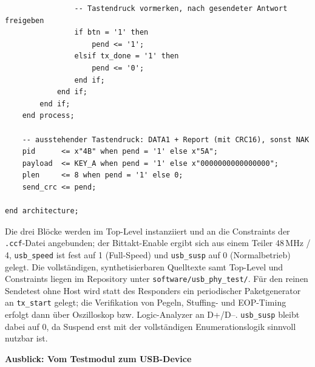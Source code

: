 \documentclass[a4paper,11pt]{article}
\begin{document}
\begin{verbatim}
                -- Tastendruck vormerken, nach gesendeter Antwort freigeben
                if btn = '1' then
                    pend <= '1';
                elsif tx_done = '1' then
                    pend <= '0';
                end if;
            end if;
        end if;
    end process;

    -- ausstehender Tastendruck: DATA1 + Report (mit CRC16), sonst NAK
    pid      <= x"4B" when pend = '1' else x"5A";
    payload  <= KEY_A when pend = '1' else x"0000000000000000";
    plen     <= 8 when pend = '1' else 0;
    send_crc <= pend;

end architecture;
\end{verbatim}

Die drei Blöcke werden im Top-Level instanziiert und an die Constraints der \texttt{.ccf}-Datei angebunden; der Bittakt-Enable ergibt sich aus einem Teiler 48\,MHz / 4, \texttt{usb\_speed} ist fest auf 1 (Full-Speed) und \texttt{usb\_susp} auf 0 (Normalbetrieb) gelegt. Die vollständigen, synthetisierbaren Quelltexte samt Top-Level und Constraints liegen im Repository unter \texttt{software/usb\_phy\_test/}. Für den reinen Sendetest ohne Host wird statt des Responders ein periodischer Paketgenerator an \texttt{tx\_start} gelegt; die Verifikation von Pegeln, Stuffing- und EOP-Timing erfolgt dann über Oszilloskop bzw. Logic-Analyzer an D+/D--. \texttt{usb\_susp} bleibt dabei auf 0, da Suspend erst mit der vollständigen Enumerationslogik sinnvoll nutzbar ist.

\textbf{Ausblick: Vom Testmodul zum USB-Device}
\end{document}
